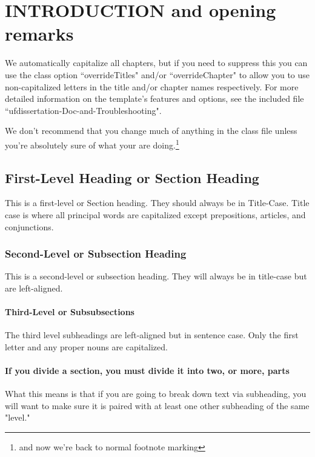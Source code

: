 \documentclass[../main.tex]{subfiles}
\begin{document}
\chapter{INTRODUCTION and opening remarks} %

We automatically capitalize all chapters, but if you need to suppress this you can use the class option ``overrideTitles" and/or ``overrideChapter" to allow you to use non-capitalized letters in the title and/or chapter names respectively. For more detailed information on the template's features and options, see the included file ``ufdissertation-Doc-and-Troubleshooting".

 We don't recommend that you change much of anything in the class file unless you're absolutely sure of what your are doing.\renewcommand*{\thefootnote}{\arabic{footnote}}\setcounter{footnote}{0}\footnote{and now we're back to normal footnote marking} 

\section{First-Level Heading or Section Heading}

This is a first-level or Section heading. They should always be in Title-Case. Title case is where all principal words are capitalized except prepositions, articles, and conjunctions.  %

\subsection{Second-Level or Subsection Heading}

This is a second-level or subsection heading. They will always be in title-case but are left-aligned. 

\subsubsection{Third-Level or Subsubsections}
The third level subheadings are left-aligned but in sentence case. Only the first letter and any proper nouns are capitalized. 

\subsubsection{If you divide a section, you must divide it into two, or more, parts}
What this means is that if you are going to break down text via subheading, you will want to make sure it is paired with at least one other subheading of the same "level." 
\end{document}

